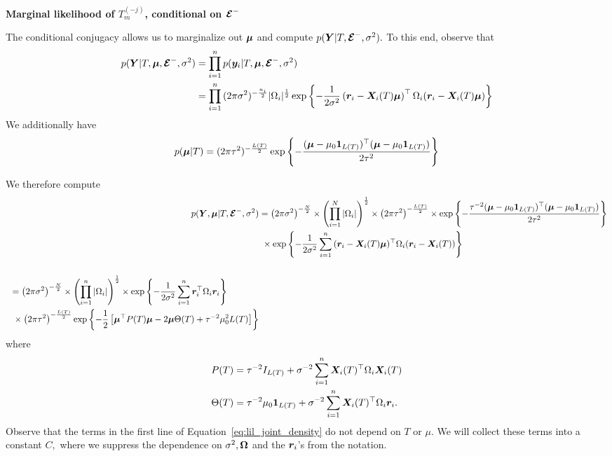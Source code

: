 \documentclass[11pt]{article}
\begin{document}
\textbf{Marginal likelihood of $T_{m}^{(-j)}$, conditional on $\boldsymbol{\mathcal{E}}^{-}$}

The conditional conjugacy allows us to marginalize out $\boldsymbol{\mu}$ and compute $p(\bm{Y} \vert T, \boldsymbol{\mathcal{E}}^{-}, \sigma^{2}).$
To this end, observe that
\begin{align*}
p(\bm{Y} \vert T, \boldsymbol{\mu}, \boldsymbol{\mathcal{E}}^{-}, \sigma^{2}) &= \prod_{i = 1}^{n}{p(\bm{y}_{i} \vert T, \boldsymbol{\mu}, \boldsymbol{\mathcal{E}}^{-}, \sigma^{2})} \\
&= \prod_{i = 1}^{n}{(2\pi\sigma^{2})^{-\frac{n_{i}}{2}}\lvert \Omega_{i} \rvert^{\frac{1}{2}}\exp\left\{-\frac{1}{2\sigma^{2}}\left(\bm{r}_{i} - \bm{X}_{i}(T)\boldsymbol{\mu}\right)^{\top}\Omega_{i}(\bm{r}_{i} - \bm{X}_{i}(T)\boldsymbol{\mu})\right\}}
\end{align*}
We additionally have
$$
p(\boldsymbol{\mu} \vert T) = (2\pi\tau^{2})^{-\frac{L(T)}{2}}\exp\left\{-\frac{(\boldsymbol{\mu} - \mu_{0}\boldsymbol{1}_{L(T)})^{\top}(\boldsymbol{\mu} - \mu_{0}\boldsymbol{1}_{L(T)})}{2\tau^{2}}\right\}
$$

We therefore compute
\begin{align}
p(\bm{Y}, \boldsymbol{\mu} \vert T, \boldsymbol{\mathcal{E}}^{-}, \sigma^{2}) &= \left(2\pi\sigma^{2}\right)^{-\frac{N}{2}} \times \left(\prod_{i = 1}^{N}{\lvert \Omega_{i} \rvert}\right)^{\frac{1}{2}} \times \left(2\pi \tau^{2}\right)^{-\frac{L(T)}{2}} \times \exp\left\{ -\frac{\tau^{-2}(\boldsymbol{\mu} - \mu_{0}\boldsymbol{1}_{L(T)})^{\top}(\boldsymbol{\mu} - \mu_{0}\boldsymbol{1}_{L(T)})}{2\tau^{2}} \right\} \nonumber \\
&~\times \exp\left\{-\frac{1}{2\sigma^{2}}\sum_{i = 1}^{n}{(\bm{r}_{i} - \bm{X}_{i}(T)\boldsymbol{\mu})^{\top}\Omega_{i}(\bm{r}_{i} - \bm{X}_{i}(T))}\right\} \nonumber \\
~ & ~ \nonumber \\ 
\begin{split}
\label{eq:lil_joint_density}
~ &= \left(2\pi\sigma^{2}\right)^{-\frac{N}{2}} \times \left(\prod_{i = 1}^{n}{\lvert \Omega_{i} \rvert}\right)^{\frac{1}{2}} \times \exp\left\{-\frac{1}{2\sigma^{2}}\sum_{i = 1}^{n}{\bm{r}_{i}^{\top}\Omega_{i}\bm{r}_{i}}\right\} \\
~ &~\times \left(2\pi\tau^{2}\right)^{-\frac{L(T)}{2}}\exp\left\{-\frac{1}{2}\left[\boldsymbol{\mu}^{\top}P(T)\boldsymbol{\mu} - 2\boldsymbol{\mu}\Theta(T) + \tau^{-2}\mu_{0}^{2}L(T) \right]\right\} 
\end{split}
\end{align}
where
\begin{align*}
P(T) &= \tau^{-2}I_{L(T)} + \sigma^{-2}\sum_{i = 1}^{n}{\bm{X}_{i}(T)^{\top}\Omega_{i}\bm{X}_{i}(T)} \\
\Theta(T) &= \tau^{-2}\mu_{0}\boldsymbol{1}_{L(T)} + \sigma^{-2}\sum_{i = 1}^{n}{\bm{X}_{i}(T)^{\top}\Omega_{i}\bm{r}_{i}}.
\end{align*} 
Observe that the terms in the first line of Equation~\eqref{eq:lil_joint_density} do not depend on $T$ or $\mu.$
We will collect these terms into a constant $C,$ where we suppress the dependence on $\sigma^{2}, \boldsymbol{\Omega}$ and the $\bm{r}_{i}$'s from the notation.
\end{document}
